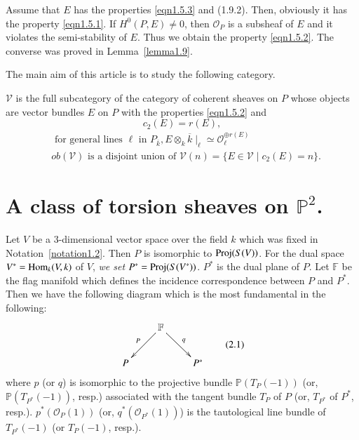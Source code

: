 \begin{Proof}
Assume that $E$ has the properties \eqref{eqn1.5.3} and
(1.9.2). Then, obviously it has the property
\eqref{eqn1.5.1}. If $H^{0}(P,E)\neq 0$, then $\mathscr{O}_P$ is a
subsheaf of $E$ and it violates the semi-stability of $E$. Thus we
obtain the property \eqref{eqn1.5.2}. 
The converse was proved in Lemma~\ref{lemma1.9}.
\enprf
\end{Proof}

The main aim of this article is to study the following category.

\begin{dfn}\label{dfn1.10}
$\mathscr{V}$ is the full subcategory of the category of coherent
  sheaves on $P$ whose objects are vector bundles $E$ on $P$ with the
  properties \eqref{eqn1.5.2} and 
\setcounter{equation}{0}
\begin{equation}\label{eqn1.10.1}
c_2(E)=r(E),
\end{equation}
\begin{equation}\label{eqn1.10.2}
\begin{aligned}
&\text{ for general lines } \ell \text{ in }
P_{\overline{k}},E\otimes_k\overline{k}\mid_{\ell} \simeq
\mathscr{O}_{\ell}^{\oplus r(E)}\\
&ob(\mathscr{V}) \text{ is a disjoint union of } \mathscr{V}(n)=\{E\in
\mathscr{V}\mid c_{2}(E)=n\}.
\end{aligned}
\end{equation}
\end{dfn}

\section{A class of torsion sheaves on \texorpdfstring{$\mathbb{P}^{2}$}{eq}.}\label{s2}

Let $V$ be a $3$-dimensional vector space over the field $k$ which
was\pageoriginale 
fixed in Notation~\ref{notation1.2}. Then $P$ is isomorphic to
$\operatorname{Proj}(S(V))$. For the dual space $V^{\ast}=\operatorname{Hom}_k(V,k)$ of $V$, {\em we set}
$P^{\ast}=\operatorname{Proj}(S(V^{\ast}))$. $P^{\ast}$ is the dual plane of $P$. Let
$\mathbb{F}$ be the flag manifold which defines the incidence
correspondence between $P$ and $P^{\ast}$. Then we have the following
diagram which is the most fundamental in the following:
\setcounter{equation}{0}
\begin{equation*}
\vcenter{
\xymatrix{&\mathbb{F}\ar[dl]_{P}\ar[dr]^{q}\\
P && P^{\ast}}}\tag{2.1}\label{eqn2.1}
\end{equation*}
where $p$ (or $q$) is isomorphic to the projective bundle
$\mathbb{P}(T_P(-1))$ (or, $\mathbb{P}(T_{P^{\ast}}(-1))$,
resp.) associated with the tangent bundle $T_P$ of $P$ (or,
$T_{P^{\ast}}$ of $P^{\ast}$, resp.). $p^{\ast}(\mathscr{O}_P(1))$ (or,
$q^{\ast}(\mathscr{O}_{P^{\ast}}(1))$) is the tautological line bundle of
$T_{P^{\ast}}(-1)$ (or $T_P(-1)$, resp.).

